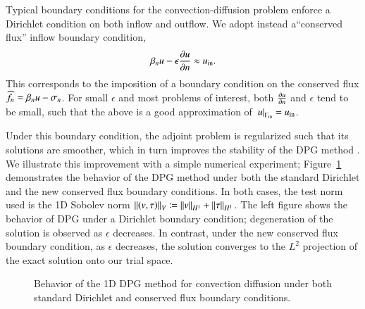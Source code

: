 Typical boundary conditions for the convection-diffusion problem enforce a Dirichlet condition on both inflow and outflow.  We adopt instead a``conserved flux'' inflow boundary condition, 
\[
\beta_nu - \epsilon\pd{u}{n} \approx u_{\rm in}.
\]
This corresponds to the imposition of a boundary condition on the conserved flux $\fnh = \beta_nu - \sigma_n$.  For small $\epsilon$ and most problems of interest, both $\pd{u}{n}$ and $\epsilon$ tend to be small, such that the above is a good approximation of $\left.u\right|_{\Gamma_{\rm in}} = u_{\rm in}$.

Under this boundary condition, the adjoint problem is regularized such that its solutions are smoother, which in turn improves the stability of the DPG method \cite{DPGrobustness2}.  We illustrate this improvement with a simple numerical experiment; Figure~\ref{fig:confusion1D} demonstrates the behavior of the DPG method under both the standard Dirichlet and the new conserved flux boundary conditions.  In both cases, the test norm used is the 1D Sobolev norm $\nor{\LRp{v,\tau}}_V\coloneqq \nor{v}_{H^1} + \nor{\tau}_{H^1}$.  The left figure shows the behavior of DPG under a Dirichlet boundary condition; degeneration of the solution is observed as $\epsilon$ decreases.  In contrast, under the new conserved flux boundary condition, as $\epsilon$ decreases, the solution converges to the $L^2$ projection of the exact solution onto our trial space.  

\begin{figure}
\centering
{}
\caption{Behavior of the 1D DPG method for convection diffusion under both standard Dirichlet and conserved flux boundary conditions.}
\label{fig:confusion1D}
\end{figure}

